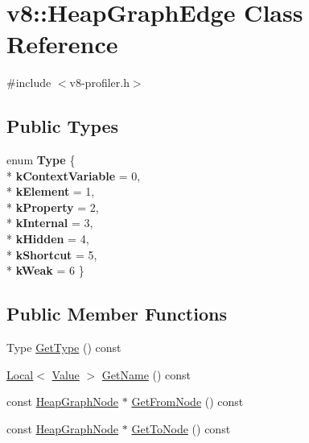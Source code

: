 \hypertarget{classv8_1_1_heap_graph_edge}{}\section{v8\+:\+:Heap\+Graph\+Edge Class Reference}
\label{classv8_1_1_heap_graph_edge}


{\ttfamily \#include $<$v8-\/profiler.\+h$>$}

\subsection*{Public Types}
\begin{DoxyCompactItemize}
\item 
enum {\bfseries Type} \{ \\*
{\bfseries k\+Context\+Variable} = 0, 
\\*
{\bfseries k\+Element} = 1, 
\\*
{\bfseries k\+Property} = 2, 
\\*
{\bfseries k\+Internal} = 3, 
\\*
{\bfseries k\+Hidden} = 4, 
\\*
{\bfseries k\+Shortcut} = 5, 
\\*
{\bfseries k\+Weak} = 6
 \}\hypertarget{classv8_1_1_heap_graph_edge_a252500cf4307fe9e4fcb0335a907259b}{}\label{classv8_1_1_heap_graph_edge_a252500cf4307fe9e4fcb0335a907259b}

\end{DoxyCompactItemize}
\subsection*{Public Member Functions}
\begin{DoxyCompactItemize}
\item 
Type \hyperlink{classv8_1_1_heap_graph_edge_a1f65f7e049044ddfa2e0e6a0d866b8c6}{Get\+Type} () const 
\item 
\hyperlink{classv8_1_1_local}{Local}$<$ \hyperlink{classv8_1_1_value}{Value} $>$ \hyperlink{classv8_1_1_heap_graph_edge_a96db62e46f79f140c23f8211ba6137af}{Get\+Name} () const 
\item 
const \hyperlink{classv8_1_1_heap_graph_node}{Heap\+Graph\+Node} $\ast$ \hyperlink{classv8_1_1_heap_graph_edge_a63484f34f83efb5e5278354c28420896}{Get\+From\+Node} () const 
\item 
const \hyperlink{classv8_1_1_heap_graph_node}{Heap\+Graph\+Node} $\ast$ \hyperlink{classv8_1_1_heap_graph_edge_a0bf74bbbaec540a4290ce5bfbb34a8c8}{Get\+To\+Node} () const 
\end{DoxyCompactItemize}



